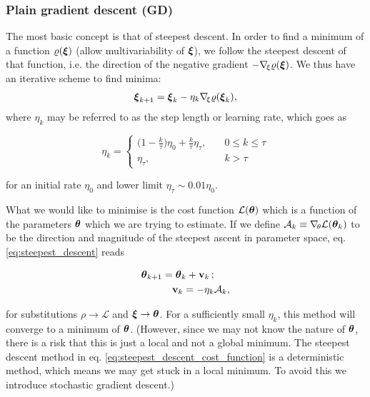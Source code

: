     \subsubsection{Plain gradient descent (GD)}\label{sec:plain_gradient_descent}
        The most basic concept is that of steepest descent. In order to find a minimum of a function $\varrho(\boldsymbol{\xi})$ (allow multivariability of $\boldsymbol{\xi}$), we follow the steepest descent of that function, i.e. the direction of the negative gradient $-\nabla_{\!\xi} \varrho(\boldsymbol{\xi})$. We thus have an iterative scheme to find minima:
        \begin{align}\label{eq:steepest_descent}
            \boldsymbol{\xi}_{k+1} = \boldsymbol{\xi}_k - \eta_k\nabla_{\!\xi} \varrho(\boldsymbol{\xi}_k),
        \end{align}
        where $\eta_k$ may be referred to as the step length or learning rate, which goes as

        \begin{equation}\label{eq:learning_schedule}
            \eta_k = \begin{cases}
                \big(1-\frac{k}{\tau}\big)\eta_0 + \frac{k}{\tau}\eta_\tau,\quad & 0 \leq k \leq \tau \\
                \eta_\tau, & k>\tau
            \end{cases}
        \end{equation}

        for an initial rate $\eta_0$ and lower limit $\eta_\tau \sim 0.01 \eta_0$.

        
        \fillertext

        What we would like to minimise is the cost function $\mathcal{L}(\boldsymbol{\theta})$ which is a function of the parameters $\boldsymbol{\theta}$ which we are trying to estimate. If we define $\mathcal{A}_k \equiv \nabla_{\!\theta} \mathcal{L}(\boldsymbol{\theta}_k)$ to be the direction and magnitude of the steepest ascent in parameter space, eq. \eqref{eq:steepest_descent} reads 
        
        \begin{equation}\label{eq:steepest_descent_cost_function}
            \begin{split}
                \boldsymbol{\theta}_{k+1} &= \boldsymbol{\theta}_k + \mathbf{v}_k\,;  \\
                &\quad \mathbf{v}_k = -\eta_k\mathcal{A}_k,
            \end{split}
        \end{equation}

        for substitutions $\rho\to\mathcal{L}$ and $\boldsymbol{\xi}\to \boldsymbol{\theta}$. For a sufficiently small $\eta_k$, this method will converge to a minimum of $\boldsymbol{\theta}$. (However, since we may not know the nature of $\boldsymbol{\theta}$, there is a risk that this is just a local and not a global minimum. The steepest descent method in eq. \eqref{eq:steepest_descent_cost_function} is a deterministic method, which means we may get stuck in a local minimum. To avoid this we introduce stochastic gradient descent.) 

